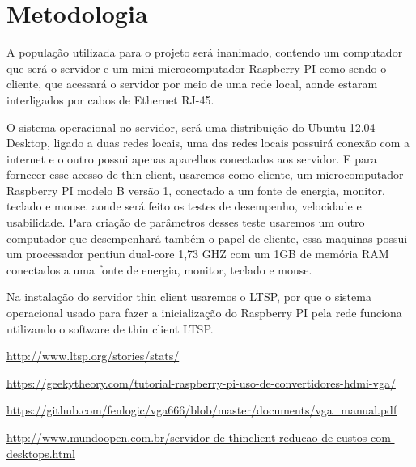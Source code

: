 \documentclass[
	12pt,				%
	openright,			%
	twoside,			%
	a4paper,			%
	chapter=TITLE,		%
	english,			%
	brazil				%
	]{abntex2}
\begin{document}

\part{Metodologia}

A população utilizada para o projeto será inanimado, contendo um computador que será o servidor e um mini microcomputador Raspberry PI como sendo o cliente, que acessará o servidor por meio de uma rede local, aonde estaram interligados por cabos de Ethernet RJ-45. 


O sistema operacional no servidor, será uma distribuição do Ubuntu 12.04 Desktop, ligado a duas redes locais, uma das redes locais possuirá conexão com a internet e o outro possui apenas aparelhos conectados aos servidor. E para fornecer esse acesso de thin client, usaremos como cliente, um microcomputador Raspberry PI modelo B versão 1, conectado a um fonte de energia, monitor, teclado e mouse. aonde será feito os testes de desempenho, velocidade e usabilidade. Para criação de parâmetros desses teste usaremos um outro computador que desempenhará também o papel de cliente, essa maquinas possui um processador pentiun dual-core 1,73 GHZ com um 1GB de memória RAM conectados a uma fonte de energia,  monitor, teclado e mouse.

Na instalação do servidor thin client usaremos o LTSP, por que o sistema operacional usado para fazer a inicialização do Raspberry PI pela rede funciona utilizando o software de thin client LTSP. %

\url{http://www.ltsp.org/stories/stats/}

 \url{https://geekytheory.com/tutorial-raspberry-pi-uso-de-convertidores-hdmi-vga/}


 \url{https://github.com/fenlogic/vga666/blob/master/documents/vga_manual.pdf}


\url{http://www.mundoopen.com.br/servidor-de-thinclient-reducao-de-custos-com-desktops.html}



\end{document}
